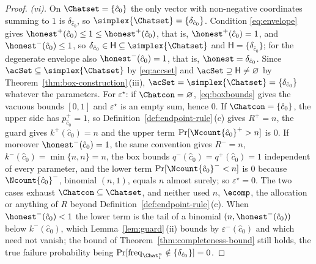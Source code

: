 \begin{proof}
\emph{(vi).} On $\Chatset=\{\hat c_0\}$ the only vector with non-negative
coordinates summing to $1$ is $\delta_{\hat c_0}$, so
$\simplex{\Chatset}=\{\delta_{\hat c_0}\}$. Condition \eqref{eq:envelope}
gives ${\honest}^{+}(\hat c_0)\le1\le{\honest}^{+}(\hat c_0)$, that is,
${\honest}^{+}(\hat c_0)=1$, and ${\honest}^{-}(\hat c_0)\le1$, so
$\delta_{\hat c_0}\in\mathsf{H}\subseteq\simplex{\Chatset}$ and
$\mathsf{H}=\{\delta_{\hat c_0}\}$; for the degenerate envelope also
${\honest}^{-}(\hat c_0)=1$, that is, $\honest=\delta_{\hat c_0}$. Since
$\acSet\subseteq\simplex{\Chatset}$ by \eqref{eq:accset} and
$\acSet\supseteq\mathsf{H}\neq\varnothing$ by Theorem~\ref{thm:box-construction}\,(iii),
$\acSet=\simplex{\Chatset}=\{\delta_{\hat c_0}\}$ whatever the parameters. For
$\varepsilon^{\star}$: if $\Chatcon=\varnothing$, \eqref{eq:boxbounds} gives
the vacuous bounds $[0,1]$ and $\varepsilon^{\star}$ is an empty sum, hence
$0$. If $\Chatcon=\{\hat c_0\}$, the upper side has
$p^{+}_{\hat c_0}=1$, so Definition~\ref{def:endpoint-rule}\,(c) gives
$R^{+}=n$, the guard gives $k^{+}(\hat c_0)=n$ and the upper term
$\Pr[\Ncount{\hat c_0}^{+}>n]$ is $0$. If moreover
${\honest}^{-}(\hat c_0)=1$, the same convention gives $R^{-}=n$,
$k^{-}(\hat c_0)=\min\{n,n\}=n$, the box bounds
$q^{-}(\hat c_0)=q^{+}(\hat c_0)=1$ independent of every parameter, and the
lower term $\Pr[\Ncount{\hat c_0}^{-}<n]$ is $0$ because
$\Ncount{\hat c_0}^{-}$, binomial $(n,1)$, equals $n$ almost surely; so
$\varepsilon^{\star}=0$. The two cases exhaust $\Chatcon\subseteq\Chatset$,
and neither used $n$, $\ecomp$, the allocation or anything of $R$ beyond
Definition~\ref{def:endpoint-rule}\,(c). When ${\honest}^{-}(\hat c_0)<1$ the
lower term is the tail of a binomial $(n,{\honest}^{-}(\hat c_0))$ below
$k^{-}(\hat c_0)$, which Lemma~\ref{lem:guard}\,(ii) bounds by
$\varepsilon^{-}(\hat c_0)$ and which need not vanish; the bound of
Theorem~\ref{thm:completeness-bound} still holds, the true failure probability being
$\Pr[\operatorname{freq}_{\Chat_1^n}\notin\{\delta_{\hat c_0}\}]=0$.
\end{proof}
